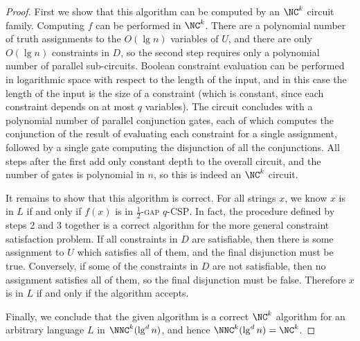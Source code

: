 \documentclass[]{article}
\begin{document}
\begin{proof}
  First we show that this algorithm can be computed by an $\NC^k$ circuit family.
  Computing $f$ can be performed in $\NC^k$.
  There are a polynomial number of truth assignments to the $O(\lg n)$ variables of $U$, and there are only $O(\lg n)$ constraints in $D$, so the second step requires only a polynomial number of parallel sub-circuits.
  Boolean constraint evaluation can be performed in logarithmic space with respect to the length of the input, and in this case the length of the input is the size of a constraint (which is constant, since each constraint depends on at most $q$ variables).
  The circuit concludes with a polynomial number of parallel conjunction gates, each of which computes the conjunction of the result of evaluating each constraint for a single assignment, followed by a single gate computing the disjunction of all the conjunctions.
  All steps after the first add only constant depth to the overall circuit, and the number of gates is polynomial in $n$, so this is indeed an $\NC^k$ circuit.

  It remains to show that this algorithm is correct.
  For all strings $x$, we know $x$ is in $L$ if and only if $f(x)$ is in \textsc{$\frac{1}{2}$-gap $q$-CSP}.
  In fact, the procedure defined by steps 2 and 3 together is a correct algorithm for the more general constraint satisfaction problem.
  If all constraints in $D$ are satisfiable, then there is some assignment to $U$ which satisfies all of them, and the final disjunction must be true.
  Conversely, if some of the constraints in $D$ are not satisfiable, then no assignment satisfies all of them, so the final disjunction must be false.
  Therefore $x$ is in $L$ if and only if the algorithm accepts.

  Finally, we conclude that the given algorithm is a correct $\NC^k$ algorithm for an arbitrary language $L$ in $\NNC^k(\lg^d n)$, and hence $\NNC^k(\lg^d n) = \NC^k$.
\end{proof}
\end{document}
